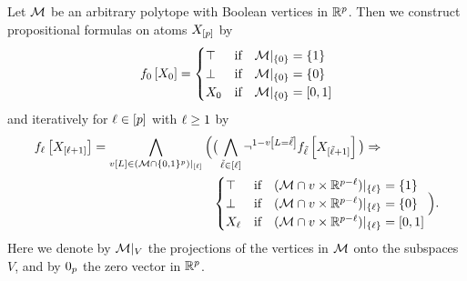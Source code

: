 \begin{theorem}\label{the:boolStatToPolytope}
    Let $\mathcal{M}$ be an arbitrary polytope with Boolean vertices in $\mathbb{R}^{p}$.
    Then we construct propositional formulas on atoms $X_{[p]}$ by
    \begin{align*}
        \formulaofat{0}{\catvariableof{0}} =
        \begin{cases}
            \top & \ifspace \restrictionofto{\meanset}{\{0\}} = \{1\} \\ %
            \bot & \ifspace \restrictionofto{\meanset}{\{0\}} = \{0\} \\%
            \catvariableof{0} & \ifspace \restrictionofto{\meanset}{\{0\}} = [0,1] %
        \end{cases}
    \end{align*}
    and iteratively for $\ell\in[p]$ with $\ell\geq1$ by
    \begin{align*}
        \formulaofat{\selindex}{\catvariableof{[\selindex+1]}} =
        \bigwedge_{\imelementwith \in \restrictionofto{(\meanset\cap \{0,1\}^{\seldim})}{[\selindex]}}
            {\Big(}&
        \big(\bigwedge_{\secselindex\in[\selindex]} \lnot^{1-\imelementat{\selvariable=\secselindex}} \formulaofat{\secselindex}{\catvariableof{[\secselindex+1]}}\big) \Rightarrow \\
            &\begin{cases}
                \top & \ifspace \restrictionofto{(\meanset\cap\imelement\times\rr^{\seldim-\selindex})}{\{\selindex\}} = \{1\} \\%
                \bot & \ifspace \restrictionofto{(\meanset\cap\imelement\times\rr^{\seldim-\selindex})}{\{\selindex\}} = \{0\} \\ %
                \catvariableof{\selindex} & \ifspace \restrictionofto{(\meanset\cap\imelement\times\rr^{\seldim-\selindex})}{\{\selindex\}} = [0,1] %
            \end{cases}
            {\Big)}.
    \end{align*}
    Here we denote by ${\mathcal{M}}|_{V}$ the projections of the vertices in $\mathcal{M}$ onto the subspaces $V$, and by $0_{p}$ the zero vector in $\mathbb{R}^{p}$.
\end{theorem}
